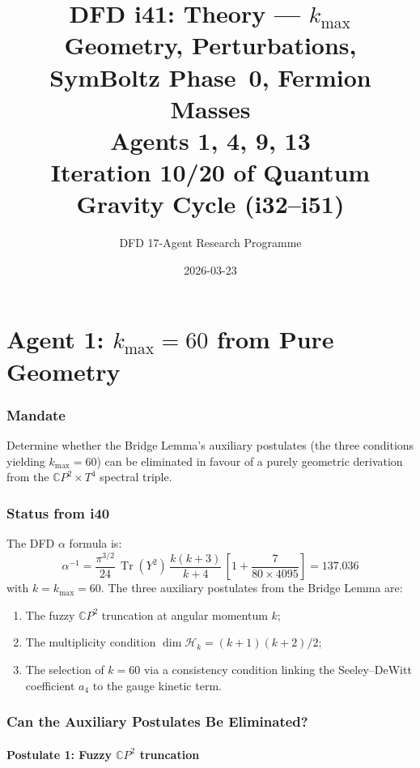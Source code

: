 \documentclass[11pt,a4paper]{article}
\title{DFD i41: Theory --- $k_{\max}$ Geometry, Perturbations, SymBoltz Phase~0, Fermion Masses\\[6pt]
\large Agents 1, 4, 9, 13\\[6pt]
\normalsize Iteration 10/20 of Quantum Gravity Cycle (i32--i51)}
\author{DFD 17-Agent Research Programme}
\date{2026-03-23}
\newcommand{\Tr}{\operatorname{Tr}}
\newcommand{\CP}{\mathbb{C}P}
\begin{document}
\maketitle
\tableofcontents
\newpage

\part{Agent 1: $k_{\max} = 60$ from Pure Geometry}
\label{part:agent1}

\section{Mandate}

Determine whether the Bridge Lemma's auxiliary postulates (the three conditions yielding $k_{\max} = 60$) can be eliminated in favour of a purely geometric derivation from the $\CP^2 \times T^4$ spectral triple.

\section{Status from i40}

The DFD $\alpha$ formula is:
\begin{equation}
\alpha^{-1} = \frac{\pi^{3/2}}{24}\,\Tr(Y^2)\,\frac{k(k+3)}{k+4}\,\left[1 + \frac{7}{80 \times 4095}\right] = 137.036
\label{eq:alpha_formula}
\end{equation}
with $k = k_{\max} = 60$. The three auxiliary postulates from the Bridge Lemma are:
\begin{enumerate}
\item The fuzzy $\CP^2$ truncation at angular momentum $k$;
\item The multiplicity condition $\dim \mathcal{H}_k = (k+1)(k+2)/2$;
\item The selection of $k = 60$ via a consistency condition linking the Seeley--DeWitt coefficient $a_4$ to the gauge kinetic term.
\end{enumerate}

\section{Can the Auxiliary Postulates Be Eliminated?}

\subsection{Postulate 1: Fuzzy $\CP^2$ truncation}
\end{document}
